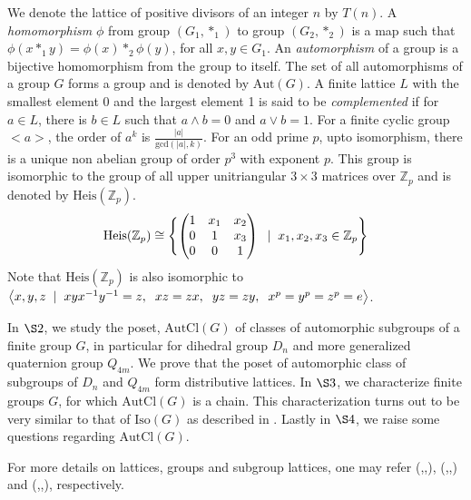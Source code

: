 \documentclass{article}
\theoremstyle{definition}
\begin{document}
 We denote the lattice of positive divisors of an integer $n$ by $T(n)$. A \emph{homomorphism} $\phi$ from group $(G_1, *_1)$ to group $(G_2,*_2)$ is a map such that $\phi(x*_1y)=\phi(x)*_2\phi(y)$, for all $x,y \in G_1$. An \emph{automorphism} of a group is a bijective homomorphism from the group to itself. The set of all automorphisms of a group $G$ forms a group and is denoted by $\text{Aut}(G)$. A finite lattice $L$ with the smallest element 0 and the largest element 1 is said to be \emph{complemented} if for $a\in L$, there is $b\in L$ such that $a\wedge b=0$ and $a\vee b=1$. For a finite cyclic group $\bigl<a\bigr>$, the order of $a^k$ is $\frac{|a|}{\text{gcd}(|a|,k)}$. For an odd prime $p$, upto isomorphism, there is a unique non abelian group of order $p^3$ with exponent $p$. This group is isomorphic to the group of all upper unitriangular $3\times 3$ matrices over $\mathbb{Z}_p$ and is denoted by $\text{Heis}(\mathbb{Z}_p)$.\begin{equation*}
    \text{Heis}(\mathbb{Z}_p)\cong \Biggl\{\begin{pmatrix}
        1 & x_1 &x_2 \\ 0 & 1 & x_3 \\ 0 & 0 &1 
    \end{pmatrix}  \hspace{0.2cm}|\hspace{0.2cm} x_1,x_2,x_3 \in \mathbb{Z}_p \Biggr\}
\end{equation*} Note that $\text{Heis}(\mathbb{Z}_p)$ is also isomorphic to $ \bigl<x,y,z \hspace{0.2cm}|\hspace{0.2cm} xyx^{-1}y^{-1}=z, \hspace{0.2cm}xz=zx, \hspace{0.2cm} yz=zy, \hspace{0.2cm}x^p=y^p=z^p=e \bigr>$.   \par
    In $\S 2$, we study the poset, $\text{AutCl}(G)$ of classes of automorphic subgroups of a finite group $G$, in particular for dihedral group $D_n$ and more generalized quaternion group $Q_{4m}$. We prove that the poset of automorphic class of subgroups of $D_n$ and $Q_{4m}$ form distributive lattices. In $\S3$, we characterize finite groups $G$, for which $\text{AutCl}(G)$ is a chain. This characterization turns out to be very similar to that of $\text{Iso}(G)$ as described in \cite{tarnauceanu2015posetsclassesisomorphicsubgroups}. Lastly in $\S4$, we raise some questions regarding $\text{AutCl}(G)$. \par
   For more details on lattices, groups and subgroup lattices, one may refer (\cite{birkhoff1940lattice},\cite{Gratzer},\cite{davey2002introduction}),  (\cite{robinson1996course},\cite{suzuki1982group},\cite{suzuki1986group}) and (\cite{Schmidt+1994},\cite{Suzuki1956},\cite{bookTarn}), respectively.
   
\end{document}
